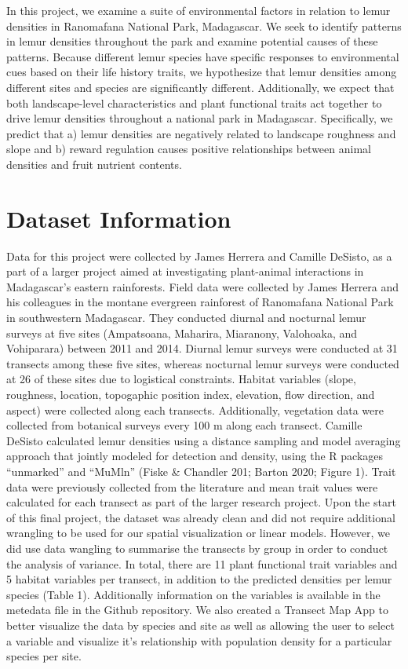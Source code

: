 \documentclass[
  12pt,
]{article}
\begin{document}
In this project, we examine a suite of environmental factors in relation
to lemur densities in Ranomafana National Park, Madagascar. We seek to
identify patterns in lemur densities throughout the park and examine
potential causes of these patterns. Because different lemur species have
specific responses to environmental cues based on their life history
traits, we hypothesize that lemur densities among different sites and
species are significantly different. Additionally, we expect that both
landscape-level characteristics and plant functional traits act together
to drive lemur densities throughout a national park in Madagascar.
Specifically, we predict that a) lemur densities are negatively related
to landscape roughness and slope and b) reward regulation causes
positive relationships between animal densities and fruit nutrient
contents.

\newpage

\hypertarget{dataset-information}{%
\section{Dataset Information}\label{dataset-information}}

Data for this project were collected by James Herrera and Camille
DeSisto, as a part of a larger project aimed at investigating
plant-animal interactions in Madagascar's eastern rainforests. Field
data were collected by James Herrera and his colleagues in the montane
evergreen rainforest of Ranomafana National Park in southwestern
Madagascar. They conducted diurnal and nocturnal lemur surveys at five
sites (Ampatsoana, Maharira, Miaranony, Valohoaka, and Vohiparara)
between 2011 and 2014. Diurnal lemur surveys were conducted at 31
transects among these five sites, whereas nocturnal lemur surveys were
conducted at 26 of these sites due to logistical constraints. Habitat
variables (slope, roughness, location, topogaphic position index,
elevation, flow direction, and aspect) were collected along each
transects. Additionally, vegetation data were collected from botanical
surveys every 100 m along each transect. Camille DeSisto calculated
lemur densities using a distance sampling and model averaging approach
that jointly modeled for detection and density, using the R packages
``unmarked'' and ``MuMln'' (Fiske \& Chandler 201; Barton 2020; Figure
1). Trait data were previously collected from the literature and mean
trait values were calculated for each transect as part of the larger
research project. Upon the start of this final project, the dataset was
already clean and did not require additional wrangling to be used for
our spatial visualization or linear models. However, we did use data
wangling to summarise the transects by group in order to conduct the
analysis of variance. In total, there are 11 plant functional trait
variables and 5 habitat variables per transect, in addition to the
predicted densities per lemur species (Table 1). Additionally
information on the variables is available in the metedata file in the
Github repository. We also created a Transect Map App to better
visualize the data by species and site as well as allowing the user to
select a variable and visualize it's relationship with population
density for a particular species per site.
\end{document}
